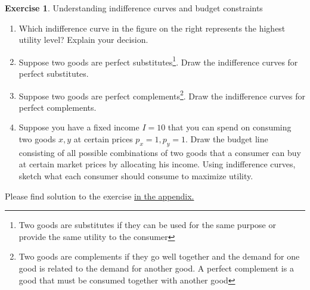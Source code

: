 \documentclass[
  12pt,
  oneside]{book}
\providecommand{\tightlist}{%
  \setlength{\itemsep}{0pt}\setlength{\parskip}{0pt}}
\theoremstyle{definition}
\theoremstyle{definition}
\theoremstyle{definition}
\newtheorem{exercise}{Exercise}[chapter]
\theoremstyle{definition}
\theoremstyle{remark}
\begin{document}
\begin{exercise}
\protect\hypertarget{exr:Uic}{}\label{exr:Uic}Understanding indifference curves and budget constraints

\begin{enumerate}
\def\labelenumi{\alph{enumi})}
\tightlist
\item
  Which indifference curve in the figure on the right represents the highest utility level? Explain your decision.
\item
  Suppose two goods are perfect substitutes\footnote{Two goods are substitutes if they can be used for the same purpose or provide the same utility to the consumer}. Draw the indifference curves for perfect substitutes.
\item
  Suppose two goods are perfect complements\footnote{Two goods are complements if they go well together and the demand for one good is related to the demand for another good. A perfect complement is a good that must be consumed together with another good}. Draw the indifference curves for perfect complements.
\item
  Suppose you have a fixed income \(I=10\) that you can spend on consuming two goods \(x, y\) at certain prices \(p_x=1, p_y=1\). Draw the budget line consisting of all possible combinations of two goods that a consumer can buy at certain market prices by allocating his income. Using indifference curves, sketch what each consumer should consume to maximize utility.
\end{enumerate}

Please find solution to the exercise \hyperref[sol:Uic]{in the appendix.}
\end{exercise}
\end{document}
